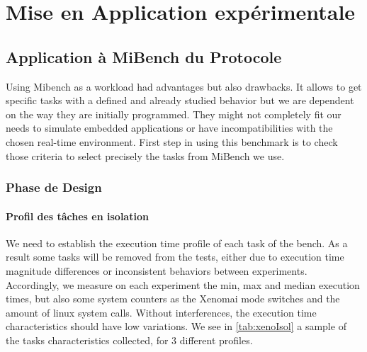 \documentclass[french, a4paper, 11pt, twoside, pdftex]{StyleThese}
\begin{document}
\setcounter{chapter}{6} %
\dominitoc
\faketableofcontents
\fi

\chapter{Mise en Application expérimentale} \label{chap:6_BilanExpes}

\minitoc

      
    \section{Application à MiBench du Protocole}
            Using Mibench as a workload had advantages but also drawbacks. It allows to get specific tasks with a defined and already studied behavior but we are dependent on the way they are initially programmed. They might not completely fit our needs to simulate embedded applications or have incompatibilities with the chosen real-time environment. First step in using this benchmark is to check those criteria to select precisely the tasks from MiBench we use.
        \subsection{Phase de Design}
            \subsubsection{Profil des tâches en isolation}
            
                    We need to establish the execution time profile of each task of the bench. As a result some tasks will be removed from the tests, either due to execution time magnitude differences or inconsistent behaviors between experiments. 
                    Accordingly, we measure on each experiment the min, max and median execution times, but also some system counters as the Xenomai mode switches and the amount of linux system calls. Without interferences, the execution time characteristics should have low  variations.%
                    We see in \autoref{tab:xenoIsol} a sample of the tasks characteristics collected, for 3 different profiles.
            
\end{document}
